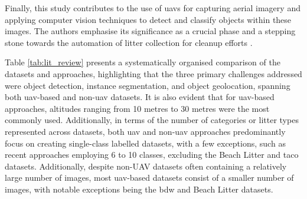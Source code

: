 Finally, this study contributes to the use of \gls{uav}s for capturing aerial imagery and applying computer vision techniques to detect and classify objects within these images. The authors emphasise its significance as a crucial phase and a stepping stone towards the automation of litter collection for cleanup efforts \cite{detect_litter, soda_dataset, daniel_thesis}.

\vspace{\baselineskip}
\noindent
Table \ref{tab:lit_review} presents a systematically organised comparison of the datasets and approaches, highlighting that the three primary challenges addressed were object detection, instance segmentation, and object geolocation, spanning both \gls{uav}-based and non-\gls{uav} datasets. It is also evident that for \gls{uav}-based approaches, altitudes ranging from 10 metres to 30 metres were the most commonly used. Additionally, in terms of the number of categories or litter types represented across datasets, both \gls{uav} and non-\gls{uav} approaches predominantly focus on creating single-class labelled datasets, with a few exceptions, such as recent approaches employing 6 to 10 classes, excluding the Beach Litter \cite{beach_litter} and \gls{taco} \cite{taco2020} datasets. Additionally, despite non-UAV datasets often containing a relatively large number of images, most \gls{uav}-based datasets consist of a smaller number of images, with notable exceptions being the \gls{bdw} \cite{bdwdataset} and Beach Litter \cite{beach_litter} datasets.

